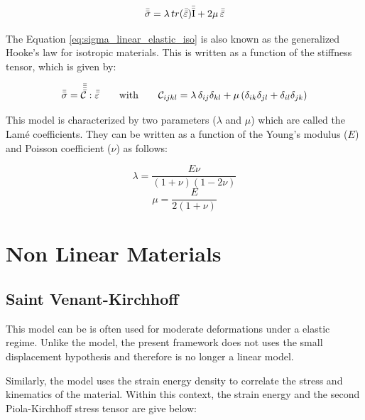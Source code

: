 \begin{equation} \label{eq:sigma_linear_elastic_iso}
    \bar{\bar{\sigma}} = \lambda \, tr(\bar{\bar{\varepsilon}}) \bar{\bar{\mathrm{I}}} + 2\mu \,\bar{\bar{\varepsilon}}
\end{equation}

The Equation \ref{eq:sigma_linear_elastic_iso} is also known as the generalized Hooke's law for isotropic materials. This is written as a function of the stiffness tensor, which is given by:

\begin{equation} \label{eq:sigma_linear_elastic_iso_C}
    \bar{\bar{\sigma}} = \bar{\bar{\bar{\bar{\mathcal{C}}}}} : \bar{\bar{\varepsilon}} \qquad \text{with} \qquad
    \mathcal{C}_{ijkl} = \lambda \, \delta_{ij}\delta_{kl} + \mu \left( \delta_{ik}\delta_{jl} + \delta_{il}\delta_{jk} \right)
\end{equation}

This model is characterized by two parameters ($\lambda$ and $\mu$) which are called the Lamé coefficients. They can be written as a function of the Young's modulus ($E$) and Poisson coefficient ($\nu$) as follows:

\begin{equation} \label{eq:lame1}
    \lambda = \frac{E \nu}{(1 + \nu)(1 - 2\nu)}
\end{equation}
\begin{equation} \label{eq:lame2}
    \mu = \frac{E}{2(1 + \nu)}
\end{equation}

\section{Non Linear Materials}  \label{sec:non_lin_mat}

\subsection{Saint Venant-Kirchhoff} \label{mat:svt}

This model can be is often used for moderate deformations under a elastic regime. Unlike the  model, the present framework does not uses the small displacement hypothesis and therefore is no longer a linear model.

Similarly, the model uses the strain energy density to correlate the stress and kinematics of the material. Within this context, the strain energy and the second Piola-Kirchhoff stress tensor are give below:


